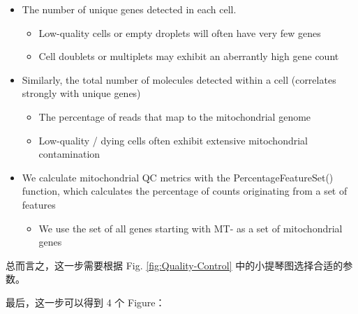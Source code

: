 \documentclass[
]{article}
\newenvironment{Shaded}{\begin{snugshade}}{\end{snugshade}}
\newcommand{\NormalTok}[1]{#1}
\newcommand{\OperatorTok}[1]{\textcolor[rgb]{0.81,0.36,0.00}{\textbf{#1}}}
\providecommand{\tightlist}{%
  \setlength{\itemsep}{0pt}\setlength{\parskip}{0pt}}
\begin{document}
\begin{itemize}
\tightlist
\item
  The number of unique genes detected in each cell.

  \begin{itemize}
  \tightlist
  \item
    Low-quality cells or empty droplets will often have very few genes
  \item
    Cell doublets or multiplets may exhibit an aberrantly high gene count
  \end{itemize}
\item
  Similarly, the total number of molecules detected within a cell (correlates
  strongly with unique genes)

  \begin{itemize}
  \tightlist
  \item
    The percentage of reads that map to the mitochondrial genome
  \item
    Low-quality / dying cells often exhibit extensive mitochondrial contamination
  \end{itemize}
\item
  We calculate mitochondrial QC metrics with the PercentageFeatureSet()
  function, which calculates the percentage of counts originating from a set of
  features

  \begin{itemize}
  \tightlist
  \item
    We use the set of all genes starting with MT- as a set of mitochondrial genes
  \end{itemize}
\end{itemize}

总而言之，这一步需要根据 Fig. \ref{fig:Quality-Control} 中的小提琴图选择合适的参数。

最后，这一步可以得到 4 个 Figure：

\begin{Shaded}
\end{Shaded}
\end{document}
